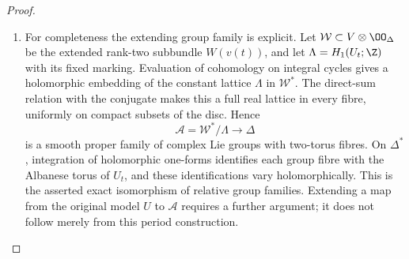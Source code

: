 \begin{proof}
\begin{enumerate}[label={$\langle1\rangle$\arabic*.},leftmargin=*]
\item For completeness the extending group family is explicit.
Let $\mathcal W\subset V\otimes\OO_\Delta$ be the extended
rank-two subbundle $W(v(t))$, and let
$\Lambda=H_1(U_t;\Z)$ with its fixed marking. Evaluation of
cohomology on integral cycles gives a holomorphic embedding
of the constant lattice $\Lambda$ in $\mathcal W^*$.
The direct-sum relation with the conjugate makes this a full
real lattice in every fibre, uniformly on compact subsets of
the disc. Hence
\[
 \mathcal A=\mathcal W^*/\Lambda\longrightarrow\Delta
\]
is a smooth proper family of complex Lie groups with
two-torus fibres. On $\Delta^*$, integration of holomorphic
one-forms identifies each group fibre with the Albanese torus
of $U_t$, and these identifications vary holomorphically.
This is the asserted exact isomorphism of relative group
families. Extending a map from the original model $U$ to
$\mathcal A$ requires a further argument; it does not follow
merely from this period construction.

\end{enumerate}
\end{proof}
